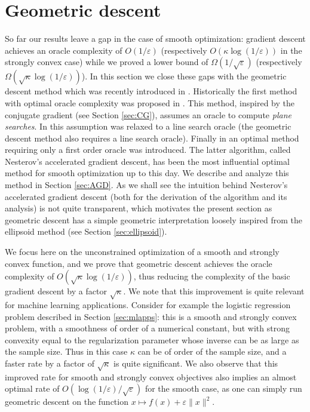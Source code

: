 \documentclass[openany]{now}
\renewcommand{\epsilon}{\varepsilon}
\begin{document}
\section{Geometric descent} \label{sec:GeoD}
So far our results leave a gap in the case of smooth optimization: gradient descent achieves an oracle complexity of $O(1/\epsilon)$ (respectively $O(\kappa \log(1/\epsilon))$ in the strongly convex case) while we proved a lower bound of $\Omega(1/\sqrt{\epsilon})$ (respectively $\Omega(\sqrt{\kappa} \log(1/\epsilon))$). In this section we close these gaps with the geometric descent method which was recently introduced in \cite{BLS15}. Historically the first method with optimal oracle complexity was proposed in \cite{NY83}. This method, inspired by the conjugate gradient (see Section \ref{sec:CG}), assumes an oracle to compute {\em plane searches}. In \cite{Nem82} this assumption was relaxed to a line search oracle (the geometric descent method also requires a line search oracle). Finally in \cite{Nes83} an optimal method requiring only a first order oracle was introduced. The latter algorithm, called Nesterov's accelerated gradient descent, has been the most influential optimal method for smooth optimization up to this day. We describe and analyze this method in Section \ref{sec:AGD}. As we shall see the intuition behind Nesterov's accelerated gradient descent (both for the derivation of the algorithm and its analysis) is not quite transparent, which motivates the present section as geometric descent has a simple geometric interpretation loosely inspired from the ellipsoid method (see Section \ref{sec:ellipsoid}).

We focus here on the unconstrained optimization of a smooth and strongly convex function, and we prove that geometric descent achieves the oracle complexity of $O(\sqrt{\kappa} \log(1/\epsilon))$, thus reducing the complexity of the basic gradient descent by a factor $\sqrt{\kappa}$. We note that this improvement is quite relevant for machine learning applications. Consider for example the logistic regression problem described in Section \ref{sec:mlapps}: this is a smooth and strongly convex problem, with a smoothness of order of a numerical constant, but with strong convexity equal to the regularization parameter whose inverse can be as large as the sample size. Thus in this case $\kappa$ can be of order of the sample size, and a faster rate by a factor of $\sqrt{\kappa}$ is quite significant. We also observe that this improved rate for smooth and strongly convex objectives also implies an almost optimal rate of $O(\log(1/\epsilon) / \sqrt{\epsilon})$ for the smooth case, as one can simply run geometric descent on the function $x \mapsto f(x) + \epsilon \|x\|^2$. 
\end{document}
